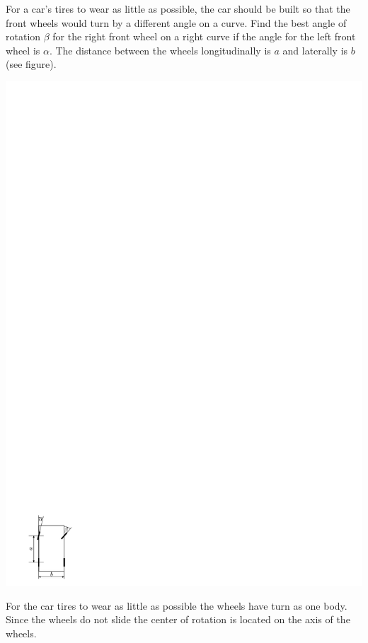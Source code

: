 For a car’s tires to wear as little as possible, the car should be built so that the front wheels would turn by a different angle on a curve. Find the best angle of rotation $\beta$ for the right front wheel on a right curve if the angle for the left front wheel is $\alpha$. The distance between the wheels longitudinally is $a$ and laterally is $b$ (see figure).
\begin{center}
\includegraphics[width=0.3\linewidth]{2012-v3g-05-r_yl_joonis}%
\end{center}

\hinteng
For the car tires to wear as little as possible the wheels have turn as one body. Since the wheels do not slide the center of rotation is located on the axis of the wheels.

